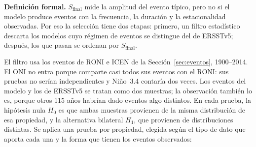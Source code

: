 \documentclass[11pt,a4paper]{article}
\begin{document}
\noindent\textbf{Definición formal.} $S_{\mathrm{final}}$ mide la amplitud del evento típico, pero no si el modelo produce eventos con la frecuencia, la duración y la estacionalidad observadas. Por eso la selección tiene dos etapas: primero, un filtro estadístico descarta los modelos cuyo régimen de eventos se distingue del de ERSSTv5; después, los que pasan se ordenan por $S_{\mathrm{final}}$.

El filtro usa los eventos de RONI e ICEN de la Sección~\ref{sec:eventos}, 1900--2014. El ONI no entra porque comparte casi todos sus eventos con el RONI: sus pruebas no serían independientes y Niño~3.4 contaría dos veces. Los eventos del modelo y los de ERSSTv5 se tratan como dos muestras; la observación también lo es, porque otros 115 años habrían dado eventos algo distintos. En cada prueba, la hipótesis nula $H_0$ es que ambas muestras provienen de la misma distribución de esa propiedad, y la alternativa bilateral $H_1$, que provienen de distribuciones distintas. Se aplica una prueba por propiedad, elegida según el tipo de dato que aporta cada una y la forma que tienen los eventos observados:
\end{document}
